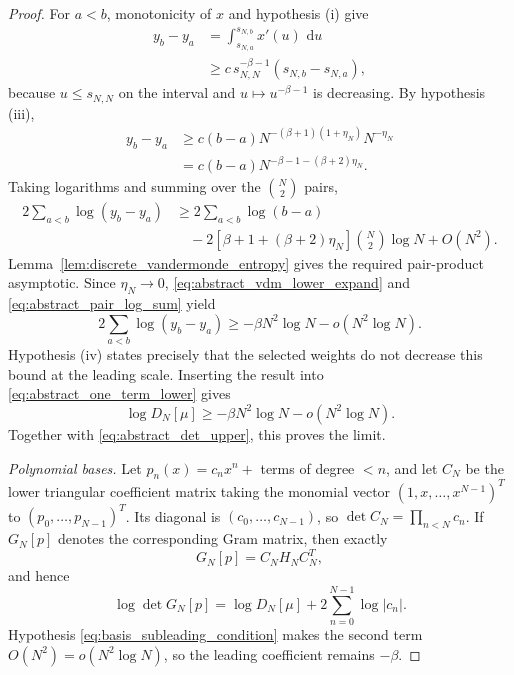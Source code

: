 \documentclass[preprint,12pt]{elsarticle}
\numberwithin{equation}{section}
\theoremstyle{plain}
\theoremstyle{definition}
\theoremstyle{remark}
\newcommand{\dd}{\,\mathrm d}
\begin{document}
\begin{proof}
For $a<b$, monotonicity of $x$ and hypothesis (i) give
\begin{align}
y_b-y_a
&=\int_{s_{N,a}}^{s_{N,b}}x'(u)\,\dd u\\
&\ge c\,s_{N,N}^{-\beta-1}(s_{N,b}-s_{N,a}),
\end{align}
because $u\le s_{N,N}$ on the interval and $u\mapsto u^{-\beta-1}$ is decreasing.  By hypothesis (iii),
\begin{align}
y_b-y_a
&\ge c(b-a)
N^{-(\beta+1)(1+\eta_N)}N^{-\eta_N}\\
&=c(b-a)N^{-\beta-1-(\beta+2)\eta_N}.
\label{eq:abstract_node_gap_lower_rigorous}
\end{align}
Taking logarithms and summing over the $\binom N2$ pairs,
\begin{align}
2\sum_{a<b}\log(y_b-y_a)
&\ge 2\sum_{a<b}\log(b-a)
\\
&\quad-2[\beta+1+(\beta+2)\eta_N]\binom N2\log N
+O(N^2).
\label{eq:abstract_vdm_lower_expand}
\end{align}
Lemma~\ref{lem:discrete_vandermonde_entropy} gives the required pair-product asymptotic.
Since $\eta_N\to0$, \eqref{eq:abstract_vdm_lower_expand} and \eqref{eq:abstract_pair_log_sum} yield
\begin{equation}
2\sum_{a<b}\log(y_b-y_a)
\ge-\beta N^2\log N-o(N^2\log N).
\end{equation}
Hypothesis (iv) states precisely that the selected weights do not decrease this bound at the leading scale.  Inserting the result into \eqref{eq:abstract_one_term_lower} gives
\begin{equation}
\log D_N[\mu]
\ge-\beta N^2\log N-o(N^2\log N).
\label{eq:abstract_det_lower}
\end{equation}
Together with \eqref{eq:abstract_det_upper}, this proves the limit.

\emph{Polynomial bases.}
Let $p_n(x)=c_nx^n+$ terms of degree $<n$, and let $C_N$ be the lower triangular coefficient matrix taking the monomial vector $(1,x,\ldots,x^{N-1})^T$ to $(p_0,\ldots,p_{N-1})^T$.  Its diagonal is $(c_0,\ldots,c_{N-1})$, so
$\det C_N=\prod_{n<N}c_n$.  If $G_N[p]$ denotes the corresponding Gram matrix, then exactly
\begin{equation}
G_N[p]=C_NH_NC_N^T,
\end{equation}
and hence
\begin{equation}
\log\det G_N[p]
=\log D_N[\mu]+2\sum_{n=0}^{N-1}\log|c_n|.
\end{equation}
Hypothesis \eqref{eq:basis_subleading_condition} makes the second term $O(N^2)=o(N^2\log N)$, so the leading coefficient remains $-\beta$.
\end{proof}
\end{document}
